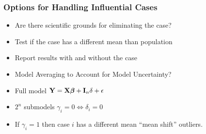 \documentclass[]{beamer}\usepackage[]{graphicx}\usepackage[]{color}
\begin{document}
\begin{frame} \frametitle{Options for Handling Influential Cases}
\begin{itemize}
\item Are there scientific grounds for eliminating the case? \pause
\item Test if the case  has a different mean than population \pause
\item Report results with and without the case \pause
\item Model Averaging to Account for Model Uncertainty?  \pause

\item Full model $\mathbf{Y} = \mathbf{X} \boldsymbol{\beta} + \mathbf{I}_n\delta + \epsilon$ \pause
\item $2^n$ submodels $\gamma_i = 0 \Leftrightarrow \delta_i = 0$
\item If $\gamma_i = 1$ then case $i$ has a different mean ``mean
  shift'' outliers.
\end{itemize}

\end{frame}
\end{document}
